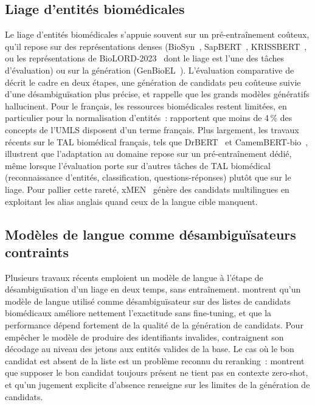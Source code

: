 \documentclass[10pt,twoside]{article}
\begin{document}
\subsection{Liage d'entités biomédicales}
Le liage d'entités biomédicales s'appuie souvent sur un pré-entraînement coûteux, qu'il
repose sur des représentations denses
(BioSyn~\cite{sung2020biosyn}, SapBERT~\cite{liu2021sapbert}, KRISSBERT~\cite{zhang2022krissbert},
ou les représentations de BioLORD-2023~\cite{remy2023biolord} dont le liage est l'une des tâches
d'évaluation) ou sur la génération
(GenBioEL~\cite{yuan2022genbioel}). L'évaluation comparative de 
décrit le cadre en deux étapes, une génération de candidats peu coûteuse suivie d'une
désambiguïsation plus précise, et rappelle que les grands modèles génératifs hallucinent. Pour le
français, les ressources biomédicales restent limitées, en particulier pour la normalisation
d'entités~:  rapportent que moins de 4\,\% des concepts de
l'UMLS disposent d'un terme français. Plus largement, les travaux récents sur le TAL biomédical
français, tels que DrBERT~\cite{labrak2023drbert} et
CamemBERT-bio~\cite{touchent2023camembertbio}, illustrent que l'adaptation au domaine repose sur un
pré-entraînement dédié, même lorsque l'évaluation porte sur d'autres tâches de TAL biomédical (reconnaissance d'entités,
classification, questions-réponses) plutôt que sur le liage. Pour pallier cette rareté, xMEN~\cite{borchert2025xmen} génère des candidats
multilingues en exploitant les alias anglais quand ceux de la langue cible manquent.

\subsection{Modèles de langue comme désambiguïsateurs contraints}
Plusieurs travaux récents emploient un modèle de langue à l'étape de désambiguïsation d'un liage en
deux temps, sans entraînement.  montrent qu'un modèle de langue
utilisé comme désambiguïsateur sur des listes de candidats biomédicaux améliore nettement l'exactitude
sans fine-tuning, et que la performance dépend fortement de la qualité de la génération de
candidats. Pour empêcher le modèle de produire des identifiants invalides,
 contraignent son décodage au niveau des jetons aux entités valides de
la base. Le cas où le bon candidat est absent de la liste est un
problème reconnu du reranking~:  montrent que supposer le bon candidat
toujours présent ne tient pas en contexte zero-shot, et qu'un jugement explicite d'absence renseigne
sur les limites de la génération de candidats.
\end{document}
